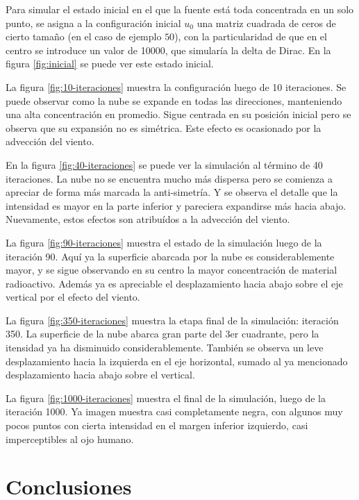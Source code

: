 \documentclass[twocolumn,a4paper,10pt]{article}
\begin{document}
Para simular el estado inicial en el que la fuente est\'a toda concentrada en un solo punto, se asigna a la configuraci\'on inicial $u_{0}$ una matriz 
cuadrada de ceros de cierto tamaño (en el caso de ejemplo $50$), con la particularidad de que en el centro se introduce un valor de 10000, que simular\'ia
la delta de Dirac. En la figura \ref{fig:inicial} se puede ver este estado inicial.

La figura \ref{fig:10-iteraciones} muestra la configuraci\'on luego de 10 iteraciones. Se puede observar como la nube se expande en todas las direcciones, 
manteniendo una alta concentraci\'on en promedio.
Sigue centrada en su posici\'on inicial pero se observa que su expansi\'on no es sim\'etrica. Este efecto es ocasionado por la advecci\'on del viento.

En la figura \ref{fig:40-iteraciones} se puede ver la simulaci\'on al t\'ermino de 40 iteraciones. La nube no se encuentra mucho más dispersa pero se 
comienza a apreciar de forma m\'as marcada la anti-simetr\'ia. Y se observa el detalle que la intensidad es mayor en la parte inferior y pareciera
expandirse m\'as hacia abajo. Nuevamente, estos efectos son atribuídos a la advecci\'on del viento.

La figura \ref{fig:90-iteraciones} muestra el estado de la simulaci\'on luego de la iteraci\'on 90. Aqu\'i ya la superficie abarcada por la nube es 
considerablemente mayor, y se sigue observando en su centro la mayor concentraci\'on de material radioactivo. Adem\'as ya es apreciable el desplazamiento hacia 
abajo sobre el eje vertical por el efecto del viento.

La figura \ref{fig:350-iteraciones} muestra la etapa final de la simulaci\'on: iteraci\'on 350. La superficie de la nube abarca gran parte del 3er cuadrante, 
pero la itensidad ya ha disminuido considerablemente. También se observa un leve desplazamiento hacia la izquierda en el eje horizontal, sumado al ya mencionado 
desplazamiento hacia abajo sobre el vertical.

La figura \ref{fig:1000-iteraciones} muestra el final de la simulaci\'on, luego de la iteraci\'on 1000. Ya imagen muestra casi completamente negra, con algunos muy 
pocos puntos con cierta intensidad en el margen inferior izquierdo, casi imperceptibles al ojo humano.


\section{Conclusiones}
\label{sec:conclusiones}
\end{document}
